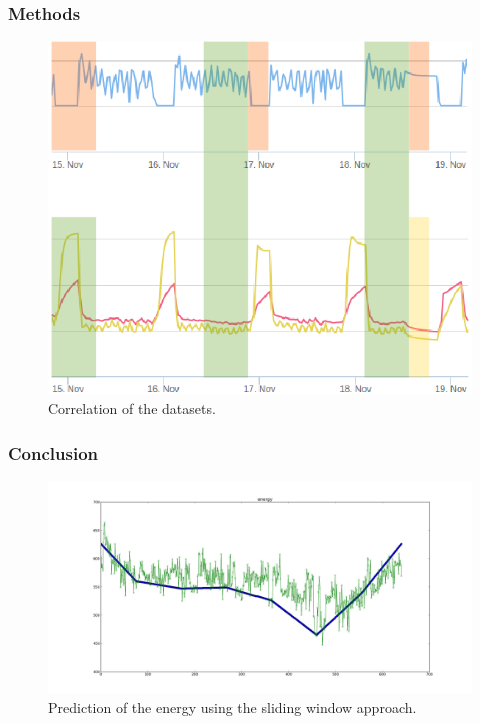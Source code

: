 \documentclass{beamer}
\begin{document}
\begin{frame}
\frametitle{Methods}

\begin{figure}[H]
  \includegraphics[width=0.6\linewidth]{img/regpred.png}
  \caption{Correlation of the datasets.}
  \label{fig:correlation}
\end{figure}
%

\end{frame}

\begin{frame}
\frametitle{Conclusion}

\begin{figure}[H]
  \includegraphics[width=0.6\linewidth]{img/predict-energy-53--0p520.png}
  \caption{Prediction of the energy using the sliding window approach.}
  \label{fig:Prediction}
\end{figure}




\end{frame}




\end{document}
